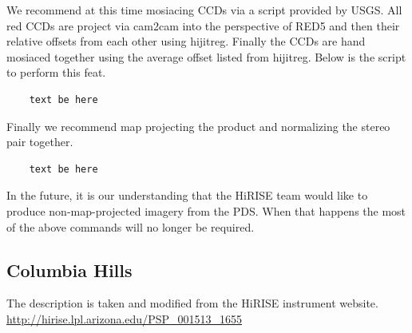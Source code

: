 We recommend at this time mosiacing CCDs via a script provided by
USGS. All red CCDs are project via cam2cam into the perspective of
RED5 and then their relative offsets from each other using
hijitreg. Finally the CCDs are hand mosiaced together using the
average offset listed from hijitreg. Below is the script to perform
this feat.

\begin{verbatim}
    text be here
\end{verbatim}

Finally we recommend map projecting the product and normalizing the
stereo pair together.

\begin{verbatim}
    text be here
\end{verbatim}

In the future, it is our understanding that the HiRISE team would like
to produce non-map-projected imagery from the PDS. When that happens
the most of the above commands will no longer be required.

\subsection{Columbia Hills}

The description is taken and modified from the HiRISE instrument website.
\url{http://hirise.lpl.arizona.edu/PSP_001513_1655}

